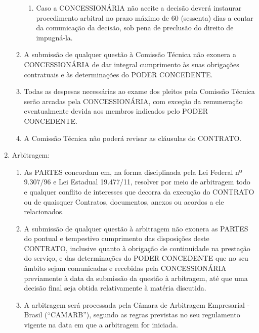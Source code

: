 \documentclass[a4paper,11pt]{report} %
\begin{document}
\begin{enumerate}
\begin{enumerate}[label*=\arabic*.]
\begin{enumerate}[label*=\arabic*.]
\item \label{itm:FZKZ} Caso a CONCESSIONÁRIA não aceite a decisão deverá instaurar procedimento arbitral no prazo máximo de 60 (sessenta) dias a contar da comunicação da decisão, sob pena de preclusão do direito de impugná-la.
\end{enumerate}

\item \label{itm:ZRHR} A submissão de qualquer questão à Comissão Técnica não exonera a CONCESSIONÁRIA de dar integral cumprimento às suas obrigações contratuais e às determinações do PODER CONCEDENTE.

\item \label{itm:VAA7} Todas as despesas necessárias ao exame dos pleitos pela Comissão Técnica serão arcadas pela CONCESSIONÁRIA, com exceção da remuneração eventualmente devida aos membros indicados pelo PODER CONCEDENTE.

\item \label{itm:HE22} A Comissão Técnica não poderá revisar as cláusulas do CONTRATO.
\end{enumerate}

\item \label{itm:9XAB} Arbitragem:

\begin{enumerate}[label*=\arabic*.]
\item \label{itm:477H} As PARTES concordam em, na forma disciplinada pela Lei Federal nº 9.307/96 e Lei Estadual 19.477/11, resolver por meio de arbitragem todo e qualquer conflito de interesses que decorra da execução do CONTRATO ou de quaisquer Contratos, documentos, anexos ou acordos a ele relacionados.

\item \label{itm:TAS6} A submissão de qualquer questão à arbitragem não exonera as PARTES do pontual e tempestivo cumprimento das disposições deste CONTRATO, inclusive quanto à obrigação de continuidade na prestação do serviço, e das determinações do PODER CONCEDENTE que no seu âmbito sejam comunicadas e recebidas pela CONCESSIONÁRIA previamente à data da submissão da questão à arbitragem, até que uma decisão final seja obtida relativamente à matéria discutida.

\item \label{itm:WPBH} A arbitragem será processada pela Câmara de Arbitragem Empresarial - Brasil (“CAMARB”), segundo as regras previstas no seu regulamento vigente na data em que a arbitragem for iniciada.


\end{enumerate}
\end{enumerate}
\end{document}
